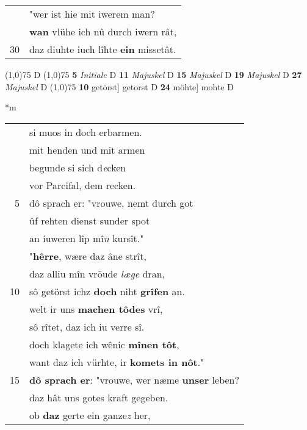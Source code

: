 \documentclass[8pt,a4paper,notitlepage]{article}
\begin{document}
\begin{table}[ht]
\begin{minipage}[t]{0.5\linewidth}
\begin{tabular}{rl}
 & "wer ist hie mit iwerem man?\\ 
 & \textbf{wan} vlühe ich nû durch iwern rât,\\ 
30 & daz diuhte iuch lîhte \textbf{ein} missetât.\\ 
\end{tabular}
\scriptsize
\line(1,0){75} \newline
D \newline
\line(1,0){75} \newline
\textbf{5} \textit{Initiale} D  \textbf{11} \textit{Majuskel} D  \textbf{15} \textit{Majuskel} D  \textbf{19} \textit{Majuskel} D  \textbf{27} \textit{Majuskel} D  \newline
\line(1,0){75} \newline
\textbf{10} getörst] getorst D \textbf{24} möhte] mohte D \newline
\end{minipage}
\hspace{0.5cm}
\begin{minipage}[t]{0.5\linewidth}
\small
\begin{center}*m
\end{center}
\begin{tabular}{rl}
 & si muos in doch erbarmen.\\ 
 & mit henden und mit armen\\ 
 & begunde si sich d\textit{e}cken\\ 
 & vor Parcifal, dem recken.\\ 
5 & dô sprach er: "vrouwe, nemt durch got\\ 
 & ûf rehten dienst sunder spot\\ 
 & an iuweren lîp mî\textit{n} kursît."\\ 
 & "\textbf{hêrre}, wære daz âne strît,\\ 
 & daz alliu mîn vröude \textit{læge} dran,\\ 
10 & sô getörst ichz \textbf{doch} niht \textbf{grîfen} an.\\ 
 & welt ir uns \textbf{machen tôdes} vrî,\\ 
 & sô rîtet, daz ich iu verre sî.\\ 
 & doch klagete ich wênic \textbf{mînen tôt},\\ 
 & want daz ich vürhte, ir \textbf{komets in nôt}."\\ 
15 & \textbf{dô sprach er}: "vrouwe, wer næme \textbf{unser} leben?\\ 
 & daz hât uns gotes kraft gegeben.\\ 
 & ob \textbf{daz} gerte ein ganze\textit{z} her,\\ 

\end{tabular}
\end{minipage}
\end{table}
\end{document}
